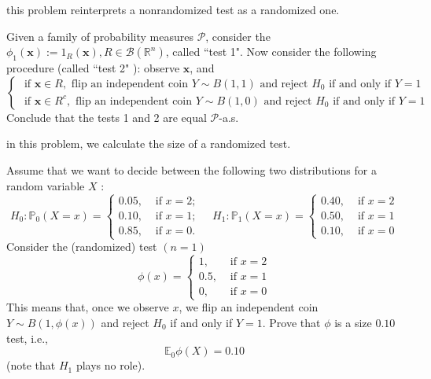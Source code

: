 \chapter{}

\begin{ex}
     this problem reinterprets a nonrandomized test as a randomized one. 

    Given a family of probability measures 
    \(\mathcal{P}\), consider the \(\phi_{1}(\mathbf{x}):=1_{R}(\mathbf{x}), R \in \mathcal{B}\left(\mathbb{R}^{n}\right)\), called ``test 1". Now consider the following procedure (called ``test 2" ): observe \(\mathbf{x}\), and
    \[\left\{\begin{array}{l}\text { if } \mathbf{x} \in R, \text { flip an independent coin } Y \sim B(1,1) \text { and reject } H_{0} \text { if and only if } Y=1 \\ \text { if } \mathbf{x} \in R^{c}, \text { flip an independent coin } Y \sim B(1,0) \text { and reject } H_{0} \text { if and only if } Y=1\end{array}\right.\]
    Conclude that the tests 1 and 2 are equal \(\mathcal{P}\)-a.s. 
\end{ex}

\begin{ex}
     in this problem, we calculate the size of a randomized test. 

    Assume that we want to decide between the following two distributions for a random variable \(X\) :
    \[
        H_{0}: \mathbb{P}_{0}(X=x)=\left\{\begin{array}{ll}
        0.05, & \text { if } x=2 ; \\
        0.10, & \text { if } x=1 ; \\
        0.85, & \text { if } x=0 .
        \end{array} \quad H_{1}: \mathbb{P}_{1}(X=x)= \begin{cases}0.40, & \text { if } x=2 \\
        0.50, & \text { if } x=1 \\
        0.10, & \text { if } x=0\end{cases}\right.
    \]
    Consider the (randomized) test \((n=1)\)
    \[
        \phi(x)=\left\{\begin{array}{cl}
        1, & \text { if } x=2 \\
        0.5, & \text { if } x=1 \\
        0, & \text { if } x=0
        \end{array}\right.
    \]
    This means that, once we observe \(x\), we flip an independent coin \(Y \sim B(1, \phi(x))\) and reject \(H_{0}\) if and only if \(Y=1\). Prove that \(\phi\) is a size \(0.10\) test, i.e.,
    \[
        \mathbb{E}_{0} \phi(X)=0.10
    \]
    (note that \(H_{1}\) plays no role). 
\end{ex}

